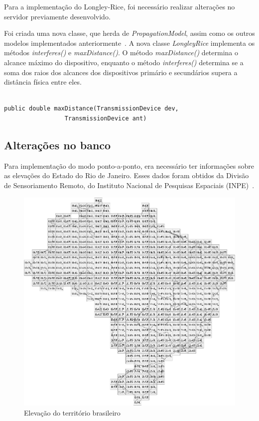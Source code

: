 Para a implementação do Longley-Rice, foi necessário realizar alterações no servidor previamente desenvolvido. 

Foi criada uma nova classe, que herda de \textit{PropagationModel}, assim como os outros modelos implementados anteriormente~\cite{tccmarcelo}. A nova classe \textit{LongleyRice} implementa os métodos \textit{
interferes()} e \textit{maxDistance()}. O método \textit{maxDistance()} determina o alcance máximo do dispositivo, enquanto o método \textit{interferes()} determina se a soma dos raios dos alcances dos dispositivos primário e secundários supera a distância física entre eles.

\begin{lstlisting}

public double maxDistance(TransmissionDevice dev,
				 TransmissionDevice ant)

\end{lstlisting}

\subsection{Alterações no banco}

Para implementação do modo ponto-a-ponto, era necessário ter informações sobre as elevações do Estado do Rio de Janeiro. Esses dados foram obtidos da Divisão de Sensoriamento Remoto, do Instituto Nacional de Pesquisas Espaciais (INPE)~\cite{elevationdata}.

\begin{figure}[htb]
\centering
\includegraphics[width=1\textwidth]{figs/elevacaobrasil}
\caption[Elevação do território brasileiro.]
{Elevação do território brasileiro}
\label{fig:elevacaobrasil}
\end{figure}

